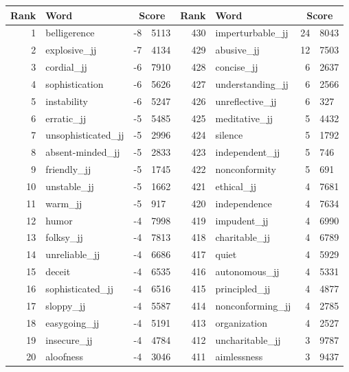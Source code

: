 \begin{table}[tbp]
    \begin{tabular}{| rlr@{.}l | rlr@{.}l |}
    \hline
    \textbf{Rank} & \textbf{Word} & \multicolumn{2}{c|}{\textbf{Score}} & \textbf{Rank} & \textbf{Word} & \multicolumn{2}{c|}{\textbf{Score}} \\
    \hline
    1 & belligerence & -8 & 5113    &    430 & imperturbable\_jj & 24 & 8043 \\
    2 & explosive\_jj & -7 & 4134    &    429 & abusive\_jj & 12 & 7503 \\
    3 & cordial\_jj & -6 & 7910    &    428 & concise\_jj & 6 & 2637 \\
    4 & sophistication & -6 & 5626    &    427 & understanding\_jj & 6 & 2566 \\
    5 & instability & -6 & 5247    &    426 & unreflective\_jj & 6 & 327 \\
    6 & erratic\_jj & -5 & 5485    &    425 & meditative\_jj & 5 & 4432 \\
    7 & unsophisticated\_jj & -5 & 2996    &    424 & silence & 5 & 1792 \\
    8 & absent-minded\_jj & -5 & 2833    &    423 & independent\_jj & 5 & 746 \\
    9 & friendly\_jj & -5 & 1745    &    422 & nonconformity & 5 & 691 \\
    10 & unstable\_jj & -5 & 1662    &    421 & ethical\_jj & 4 & 7681 \\
    11 & warm\_jj & -5 & 917    &    420 & independence & 4 & 7634 \\
    12 & humor & -4 & 7998    &    419 & impudent\_jj & 4 & 6990 \\
    13 & folksy\_jj & -4 & 7813    &    418 & charitable\_jj & 4 & 6789 \\
    14 & unreliable\_jj & -4 & 6686    &    417 & quiet & 4 & 5929 \\
    15 & deceit & -4 & 6535    &    416 & autonomous\_jj & 4 & 5331 \\
    16 & sophisticated\_jj & -4 & 6516    &    415 & principled\_jj & 4 & 4877 \\
    17 & sloppy\_jj & -4 & 5587    &    414 & nonconforming\_jj & 4 & 2785 \\
    18 & easygoing\_jj & -4 & 5191    &    413 & organization & 4 & 2527 \\
    19 & insecure\_jj & -4 & 4784    &    412 & uncharitable\_jj & 3 & 9787 \\
    20 & aloofness & -4 & 3046    &    411 & aimlessness & 3 & 9437 \\

\end{tabular}
\end{table}
